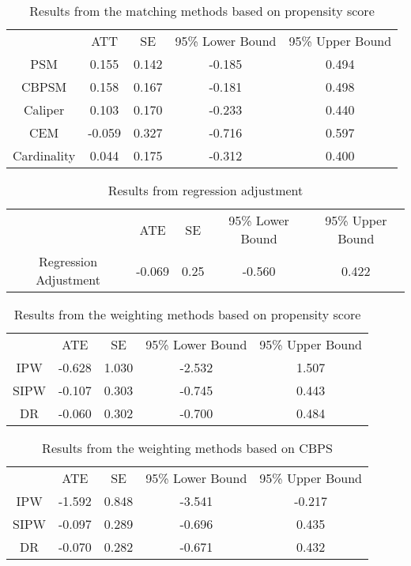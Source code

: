 \documentclass{article}
\begin{document}
\begin{table}[t]
\caption{Results from the matching methods based on propensity score} \label{tb7}
\footnotesize
\centering
{\tabcolsep=20pt
\begin{tabular}{c||c|c|c|c}
\hline
            & ATT   & SE    & 95\% Lower Bound & 95\% Upper Bound \\ \hhline{=#=|=|=|=}
PSM          & 0.155 & 0.142 & -0.185      & 0.494       \\ \hline
CBPSM        & 0.158 & 0.167 & -0.181      & 0.498       \\ \hline
Caliper     & 0.103 & 0.170 & -0.233      & 0.440       \\ \hline
CEM         & -0.059 & 0.327 & -0.716      & 0.597       \\ \hline
Cardinality & 0.044 & 0.175 & -0.312      & 0.400       \\ \hline
\end{tabular}}
\end{table}

\begin{table}[t]
\caption{{\color{ao}Results from regression adjustment}} \label{tbRA2}
\footnotesize
\centering
{\tabcolsep=16.5pt
\begin{tabular}{c||c|c|c|c}
\hline
     & ATE    & SE    & 95\% Lower Bound & 95\% Upper Bound \\ \hhline{=#=|=|=|=}
Regression Adjustment  & -0.069 & 0.25 & -0.560      & 0.422       \\ \hline
\end{tabular}}
\end{table}

\begin{table}[t]
\caption{Results from the weighting methods based on propensity score} \label{tb8}
\footnotesize
\centering
{\tabcolsep=22pt
\begin{tabular}{c||c|c|c|c}
\hline
     & ATE    & SE    & 95\% Lower Bound & 95\% Upper Bound \\ \hhline{=#=|=|=|=}
IPW  & -0.628 & 1.030 & -2.532      & 1.507       \\ \hline
SIPW & -0.107 & 0.303 & -0.745      & 0.443       \\ \hline
DR   & -0.060 & 0.302 & -0.700      & 0.484       \\ \hline
\end{tabular}}
\end{table}

\begin{table}[t]
\caption{Results from the weighting methods based on CBPS} \label{tb9}
\footnotesize
\centering
{\tabcolsep=22pt
\begin{tabular}{c||c|c|c|c}
\hline
     & ATE    & SE    & 95\% Lower Bound & 95\% Upper Bound \\ \hhline{=#=|=|=|=}
IPW  & -1.592 & 0.848 & -3.541      & -0.217       \\ \hline
SIPW & -0.097 & 0.289 & -0.696      & 0.435       \\ \hline
DR   & -0.070 & 0.282 & -0.671      & 0.432       \\ \hline
\end{tabular}}
\end{table}
\end{document}
